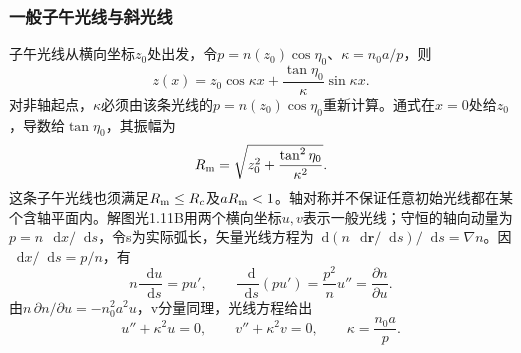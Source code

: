 \documentclass[UTF8,fontset=fandol,a4paper,11pt]{ctexart}
\newcommand{\dd}{\mathop{}\!\mathrm{d}}
\begin{document}
\subsubsection*{一般子午光线与斜光线}
子午光线从横向坐标$z_0$处出发，令$p=n(z_0)\cos\eta_0$、$\kappa=n_0a/p$，则
\[
z(x)=z_0\cos\kappa x+\frac{\tan\eta_0}{\kappa}\sin\kappa x.
\]
对非轴起点，$\kappa$必须由该条光线的$p=n(z_0)\cos\eta_0$重新计算。通式在$x=0$处给$z_0$，导数给$\tan\eta_0$，其振幅为
\[
R_{\rm m}=\sqrt{z_0^2+\frac{\tan^2\eta_0}{\kappa^2}}.
\]
这条子午光线也须满足$R_{\rm m}\le R_c$及$aR_{\rm m}<1$。轴对称并不保证任意初始光线都在某个含轴平面内。解图光1.11B用两个横向坐标$u,v$表示一般光线；守恒的轴向动量为$p=n\,\dd x/\dd s$，令s为实际弧长，矢量光线方程为$\dd(n\,\dd\boldsymbol r/\dd s)/\dd s=\nabla n$。因$\dd x/\dd s=p/n$，有
\[
n\frac{\dd u}{\dd s}=p u',\qquad
\frac{\dd}{\dd s}(pu')=\frac{p^2}{n}u''
=\frac{\partial n}{\partial u}.
\]
由$n\,\partial n/\partial u=-n_0^2a^2u$，v分量同理，光线方程给出
\[
u''+\kappa^2u=0,\qquad v''+\kappa^2v=0,\qquad
\kappa=\frac{n_0a}{p}.
\]
\end{document}
